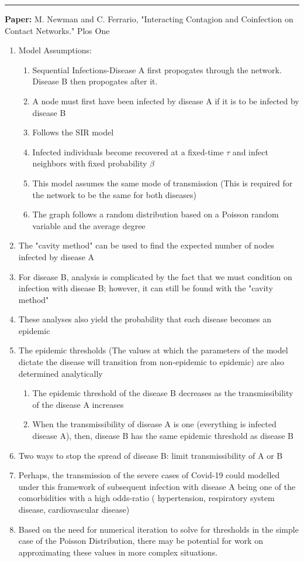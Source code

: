 \documentclass[11pt]{article}
\begin{document}
\smallskip
\noindent
\rule{\textwidth}{0.01in}
\textbf{Paper:} M. Newman and C. Ferrario, "Interacting Contagion and Coinfection on Contact Networks." Plos One
\begin{enumerate}
    \item Model Assumptions:
    \begin{enumerate}
        \item Sequential Infections-Disease A first propogates through the network. Disease B then propogates after it.
        \item A node must first have been infected by disease A if it is to be infected by disease B
        \item Follows the SIR model
        \item Infected individuals become recovered at a fixed-time $\tau$ and infect neighbors with fixed probability $\beta$
        \item This model assumes the same mode of transmission (This is required for the network to be the same for both diseases)
        \item The graph follows a random distribution based on a Poisson random variable and the average degree
    \end{enumerate}
    \item The "cavity method" can be used to find the expected number of nodes infected by disease A
    \item For disease B, analysis is complicated by the fact that we must condition on infection with disease B; however, it can still be found with the "cavity method"
    \item These analyses also yield the probability that each disease becomes an epidemic
    \item The epidemic thresholds (The values at which the parameters of the model dictate the disease will transition from non-epidemic to epidemic) are also determined analytically
    \begin{enumerate}
        
        \item The epidemic threshold of the disease B decreases as the transmissibility of the disease A increases
        
        \item When the transmissibility of disease A is one (everything is infected disease A), then, disease B has the same epidemic threshold as disease B
        
    \end{enumerate}
    \item Two ways to stop the spread of disease B: limit transmissibility of A or B
    \item Perhaps, the transmission of the severe cases of Covid-19 could modelled under this framework of subsequent infection with disease A being one of the comorbidities with a high odds-ratio ( hypertension, respiratory system disease, cardiovascular
    disease)
    \item Based on the need for numerical iteration to solve for thresholds in the simple case of the Poisson Distribution, there may be potential for work on approximating these values in more complex situations. 
    
\end{enumerate}
\end{document}
